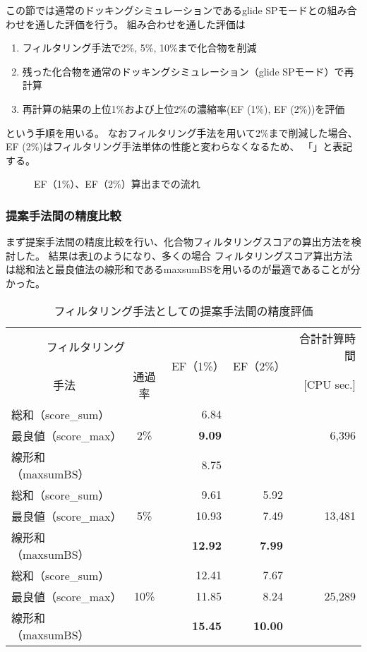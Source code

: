 この節では通常のドッキングシミュレーションであるglide SPモードとの組み合わせを通した評価を行う。
組み合わせを通した評価は
\begin{enumerate}
\item フィルタリング手法で2\%, 5\%, 10\%まで化合物を削減
\item 残った化合物を通常のドッキングシミュレーション（glide SPモード）で再計算
\item 再計算の結果の上位1\%および上位2\%の濃縮率(EF (1\%), EF (2\%))を評価
\end{enumerate}
という手順を用いる。
なおフィルタリング手法を用いて2\%まで削減した場合、EF (2\%)はフィルタリング手法単体の性能と変わらなくなるため、
「\textendash」と表記する。

\begin{figure}[htp]
 \begin{center}
  \caption{EF（1\%）、EF（2\%）算出までの流れ}
  \label{fig:filtering_image}
 \end{center}
\end{figure}

\subsubsection{提案手法間の精度比較}\label{subsubsec:filtering_proposal}
まず提案手法間の精度比較を行い、化合物フィルタリングスコアの算出方法を検討した。
結果は表\ref{table:filtering_proposal}のようになり、多くの場合
フィルタリングスコア算出方法は総和法と最良値法の線形和であるmaxsumBSを用いるのが最適であることが分かった。

\begin{table}[htb] \centering
	\caption{フィルタリング手法としての提案手法間の精度評価}
	\label{table:filtering_proposal}
	\begin{tabular}{lc|rr|r}
	\hline
	\multicolumn{2}{c|}{フィルタリング}	&\multirow{2}{*}{EF（1\%）}	&\multirow{2}{*}{EF（2\%）}	&合計計算時間	\\
	\multicolumn{1}{c}{手法}	&通過率	&						&						&[CPU sec.]		\\ \hline
	総和（score\_sum）		&		&6.84					&\textendash				&				\\
	最良値（score\_max）	&2\%	&\textbf{9.09}				&\textendash				&6,396			\\
	線形和（maxsumBS）	&		&8.75					&\textendash				&				\\ \hline
	総和（score\_sum）		&		&9.61					&5.92					&				\\
	最良値（score\_max）	&5\%	&10.93					&7.49					&13,481			\\
	線形和（maxsumBS）	&		&\textbf{12.92}			&\textbf{7.99}				&				\\ \hline
	総和（score\_sum）		&		&12.41					&7.67					&				\\
	最良値（score\_max）	&10\%	&11.85					&8.24					&25,289			\\
	線形和（maxsumBS）	&		&\textbf{15.45}			&\textbf{10.00}			&				\\ \hline
	\end{tabular}
\end{table}


